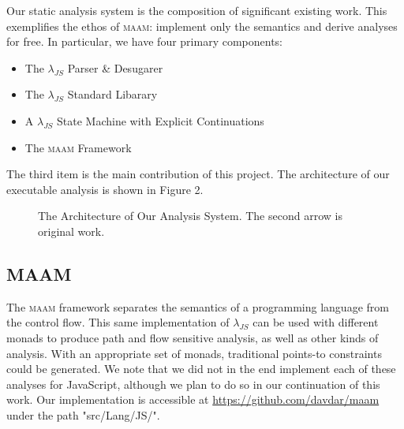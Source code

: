 \documentclass[10pt,letter,english]{article}
\newcommand{\maam}[0]{\textsc{maam}}
\newcommand{\js}[0]{JavaScript}
\newcommand{\lambdajs}[0]{$\lambda_{JS}$}
\begin{document}
Our static analysis system is the composition of significant existing work. This
exemplifies the ethos of \maam{}: implement only the semantics and derive
analyses for free. In particular, we have four primary components:

\begin{itemize}
\item The \lambdajs{} Parser \& Desugarer
\item The \lambdajs{} Standard Libarary
\item A \lambdajs{} State Machine with Explicit Continuations
\item The \maam{} Framework
\end{itemize}

The third item is the main contribution of this project.
The architecture of our executable analysis is shown in Figure 2.

\begin{figure}
\centering

\caption{The Architecture of Our Analysis System. The second arrow is original work.}
\end{figure}

\subsection{MAAM}

The \maam{} framework separates the semantics of a programming language from the
control flow. This same implementation of \lambdajs{} can be used with different
monads to produce path and flow sensitive analysis, as well as other kinds of
analysis. With an appropriate set of monads, traditional points-to constraints
could be generated. We note that we did not in the end implement each of these
analyses for \js{}, although we plan to do so in our continuation of this work.
Our implementation is accessible at \url{https://github.com/davdar/maam}
under the path "src/Lang/JS/".
\end{document}
